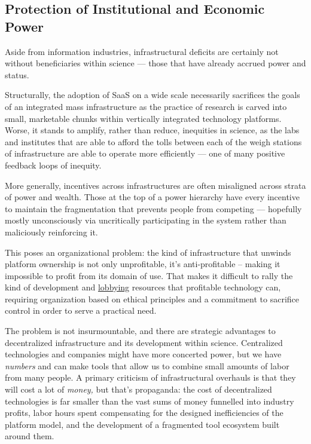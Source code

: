 \documentclass[10pt]{tufte-book}
\begin{document}
\subsection{Protection of Institutional and Economic
Power}

Aside from information industries, infrastructural deficits are
certainly not without beneficiaries within science --- those that have
already accrued power and status.

Structurally, the adoption of SaaS on a wide scale necessarily
sacrifices the goals of an integrated mass infrastructure as the
practice of research is carved into small, marketable chunks within
vertically integrated technology platforms. Worse, it stands to amplify,
rather than reduce, inequities in science, as the labs and institutes
that are able to afford the tolls between each of the weigh stations of
infrastructure are able to operate more efficiently --- one of many
positive feedback loops of inequity.

More generally, incentives across infrastructures are often misaligned
across strata of power and wealth. Those at the top of a power hierarchy
have every incentive to maintain the fragmentation that prevents people
from competing --- hopefully mostly unconsciously via uncritically
participating in the system rather than maliciously reinforcing it.

This poses an organizational problem: the kind of infrastructure that
unwinds platform ownership is not only unprofitable, it's
anti-profitable -- making it impossible to profit from its domain of
use. That makes it difficult to rally the kind of development and
\href{https://www.snsi.info/}{lobbying} resources that profitable
technology can, requiring organization based on ethical principles and a
commitment to sacrifice control in order to serve a practical need.

The problem is not insurmountable, and there are strategic advantages to
decentralized infrastructure and its development within science.
Centralized technologies and companies might have more concerted power,
but we have \emph{numbers} and can make tools that allow us to combine
small amounts of labor from many people. A primary criticism of
infrastructural overhauls is that they will cost a lot of \emph{money,}
but that's propaganda: the cost of decentralized technologies is far
smaller than the vast sums of money funnelled into industry profits,
labor hours spent compensating for the designed inefficiencies of the
platform model, and the development of a fragmented tool ecosystem built
around them.
\end{document}
